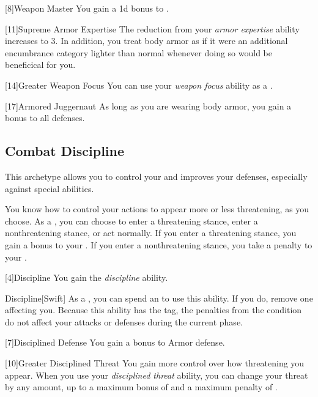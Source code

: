         [8]{Weapon Master} 
        You gain a \plus1d bonus to .

        [11]{Supreme Armor Expertise}
        The  reduction from your \textit{armor expertise} ability increases to 3.
        In addition, you treat body armor as if it were an additional encumbrance category lighter than normal whenever doing so would be beneficical for you.

        [14]{Greater Weapon Focus} You can use your \textit{weapon focus} ability as a .

        [17]{Armored Juggernaut}
        As long as you are wearing body armor, you gain a  bonus to all defenses.

    \subsection{Combat Discipline}
        This archetype allows you to control your  and improves your defenses, especially against special abilities.

        You know how to control your actions to appear more or less threatening, as you choose.
        As a , you can choose to enter a threatening stance, enter a nonthreatening stance, or act normally.
        If you enter a threatening stance, you gain a  bonus to your .
        If you enter a nonthreatening stance, you take a  penalty to your .

        [4]{Discipline} You gain the \textit{discipline} ability.
        \begin{ability}{Discipline}[Swift]
            As a , you can spend an  to use this ability.
            If you do, remove one  affecting you.
            Because this ability has the  tag, the penalties from the condition do not affect your attacks or defenses during the current phase.
        \end{ability}

        [7]{Disciplined Defense}
        You gain a  bonus to Armor defense.

        [10]{Greater Disciplined Threat}
        You gain more control over how threatening you appear.
        When you use your \textit{disciplined threat} ability, you can change your threat by any amount, up to a maximum bonus of  and a maximum penalty of .

